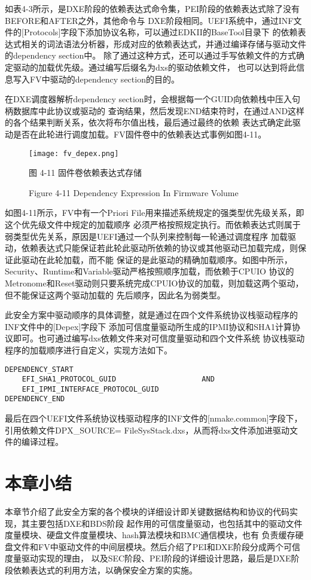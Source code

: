 如表4-3所示，是DXE阶段的依赖表达式命令集，PEI阶段的依赖表达式除了没有BEFORE和AFTER之外，其他命令与
DXE阶段相同。UEFI系统中，通过INF文件的[Protocols]字段下添加协议名称，可以通过EDKII的BaseTool目录下
的依赖表达式相关的词法语法分析器，形成对应的依赖表达式，并通过编译存储与驱动文件的dependency section中。
除了通过这种方式，还可以通过手写依赖文件的方式确定驱动的加载优先级。通过编写后缀名为dxs的驱动依赖文件，
也可以达到将此信息写入FV中驱动的dependency section的目的。
\par 在DXE调度器解析dependency section时，会根据每一个GUID向依赖栈中压入句柄数据库中此协议或驱动的
查询结果，然后发现END结束符时，在通过AND这样的各个结果判断关系，依次将布尔值出栈，最后通过最终的依赖
表达式确定此驱动是否在此轮进行调度加载。FV固件卷中的依赖表达式事例如图4-11。

\begin{figure}[htb]
    \vspace{0cm}   
    \setlength{\abovecaptionskip}{0.3cm}
	\centering
    \texttt{[image: fv\_depex.png]}
    \caption*{图 4-11 固件卷依赖表达式存储}
    \setlength{\belowcaptionskip}{-0.7cm}
    \caption*{Figure 4-11 Dependency Expression In Firmware Volume}
\end{figure}

如图4-11所示，FV中有一个Priori File用来描述系统规定的强类型优先级关系，即这个优先级文件中规定的加载顺序
必须严格按照规定执行。而依赖表达式则属于弱类型优先关系，原因是UEFI通过一个队列来控制每一轮通过调度程序
加载驱动，依赖表达式只能保证若此轮此驱动所依赖的协议或其他驱动已加载完成，则保证此驱动在此轮加载，而不能
保证的是此驱动的精确加载顺序。如图中所示，Security、Runtime和Variable驱动严格按照顺序加载，而依赖于CPUIO
协议的Metronome和Reset驱动则只要系统完成CPUIO协议的加载，则加载这两个驱动，但不能保证这两个驱动加载的
先后顺序，因此名为弱类型。
\par 此安全方案中驱动顺序的具体调整，就是通过在四个文件系统协议栈驱动程序的INF文件中的[Depex]字段下
添加可信度量驱动所生成的IPMI协议和SHA1计算协议即可。也可通过编写dxs依赖文件来对可信度量驱动和四个文件系统
协议栈驱动程序的加载顺序进行自定义，实现方法如下。

\begin{lstlisting}
DEPENDENCY_START
    EFI_SHA1_PROTOCOL_GUID                    AND
    EFI_IPMI_INTERFACE_PROTOCOL_GUID
DEPENDENCY_END
\end{lstlisting}
\par 最后在四个UEFI文件系统协议栈驱动程序的INF文件的[nmake.common]字段下，引用依赖文件DPX\_SOURCE=
FileSysStack.dxs，从而将dxs文件添加进驱动文件的编译过程。

%
%
\section{本章小结}
本章节介绍了此安全方案的各个模块的详细设计即关键数据结构和协议的代码实现，其主要包括DXE和BDS阶段
起作用的可信度量驱动，也包括其中的驱动文件度量模块、硬盘文件度量模块、hash算法模块和BMC通信模块，也有
负责缓存硬盘文件和FV中驱动文件的中间层模块。然后介绍了PEI和DXE阶段分成两个可信度量驱动实现的理由，
以及SEC阶段、PEI阶段的详细设计思路，最后是DXE阶段依赖表达式的利用方法，以确保安全方案的实施。

\bjutclearpage
